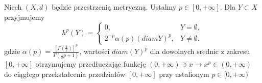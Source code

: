 \begin{defi}
	Niech $(X, d)$ będzie przestrzenią metryczną. Ustalmy $p \in [0, +\infty]$. Dla $Y \subset X$ przyjmujemy 
	$$
		h^p(Y) = 
		\begin{cases}
			0, & Y = \emptyset, \\
			2^{-p}\alpha(p)(diam Y)^p, & Y \neq \emptyset.
		\end{cases}
	$$ gdzie $\alpha(p) = \frac{[\Gamma(\frac{1}{2})]^p}{\Gamma(\frac{1}{2}p + 1)}$, wartości $diam(Y)^p$ dla dowolnych srednic z zakresu $[0, +\infty]$ otrzymujemy przedłuczając funkcję $(0, +\infty) \ni x \rightarrow x^p \in (0, +\infty)$ do ciągłego przekstałcenia przedziałów $[0, +\infty]$ przy ustalionym $p \in [0, +\infty)$ 
\end{defi}